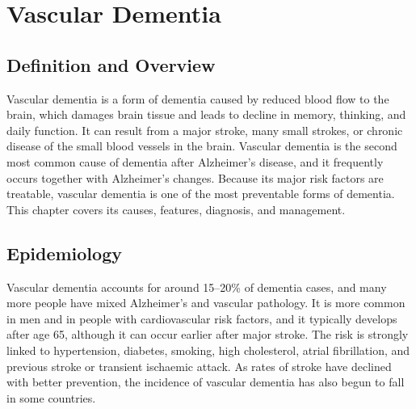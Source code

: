 \chapter{Vascular Dementia}

\section*{Definition and Overview}
Vascular dementia is a form of dementia caused by reduced blood flow to the brain, which damages brain tissue and leads to decline in memory, thinking, and daily function. It can result from a major stroke, many small strokes, or chronic disease of the small blood vessels in the brain. Vascular dementia is the second most common cause of dementia after Alzheimer's disease, and it frequently occurs together with Alzheimer's changes. Because its major risk factors are treatable, vascular dementia is one of the most preventable forms of dementia. This chapter covers its causes, features, diagnosis, and management.

\section*{Epidemiology}
Vascular dementia accounts for around 15--20\% of dementia cases, and many more people have mixed Alzheimer's and vascular pathology. It is more common in men and in people with cardiovascular risk factors, and it typically develops after age 65, although it can occur earlier after major stroke. The risk is strongly linked to hypertension, diabetes, smoking, high cholesterol, atrial fibrillation, and previous stroke or transient ischaemic attack. As rates of stroke have declined with better prevention, the incidence of vascular dementia has also begun to fall in some countries.

